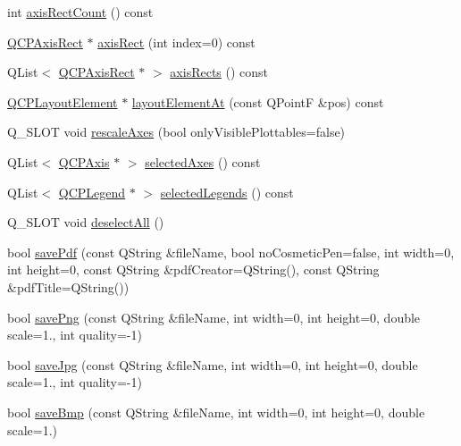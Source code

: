 \begin{DoxyCompactItemize}
\item 
int \mbox{\hyperlink{class_q_custom_plot_a8f85940aaac50efb466287d9d2d04ec6}{axis\+Rect\+Count}} () const
\item 
\mbox{\hyperlink{class_q_c_p_axis_rect}{Q\+C\+P\+Axis\+Rect}} $\ast$ \mbox{\hyperlink{class_q_custom_plot_ae5eefcb5f6ca26689b1fd4f6e25b42f9}{axis\+Rect}} (int index=0) const
\item 
Q\+List$<$ \mbox{\hyperlink{class_q_c_p_axis_rect}{Q\+C\+P\+Axis\+Rect}} $\ast$ $>$ \mbox{\hyperlink{class_q_custom_plot_a12af771429e2d7e313c8c5d5fca068fe}{axis\+Rects}} () const
\item 
\mbox{\hyperlink{class_q_c_p_layout_element}{Q\+C\+P\+Layout\+Element}} $\ast$ \mbox{\hyperlink{class_q_custom_plot_afaa1d304e0287d140fd238e90889ef3c}{layout\+Element\+At}} (const Q\+PointF \&pos) const
\item 
Q\+\_\+\+S\+L\+OT void \mbox{\hyperlink{class_q_custom_plot_ad86528f2cee6c7e446dea4a6e8839935}{rescale\+Axes}} (bool only\+Visible\+Plottables=false)
\item 
Q\+List$<$ \mbox{\hyperlink{class_q_c_p_axis}{Q\+C\+P\+Axis}} $\ast$ $>$ \mbox{\hyperlink{class_q_custom_plot_a7e6b07792b1cb2c31681596582d14dbe}{selected\+Axes}} () const
\item 
Q\+List$<$ \mbox{\hyperlink{class_q_c_p_legend}{Q\+C\+P\+Legend}} $\ast$ $>$ \mbox{\hyperlink{class_q_custom_plot_ac87624ddff1cbf4064781a8e8ae321c4}{selected\+Legends}} () const
\item 
Q\+\_\+\+S\+L\+OT void \mbox{\hyperlink{class_q_custom_plot_a9d4808ab925b003054085246c92a257c}{deselect\+All}} ()
\item 
bool \mbox{\hyperlink{class_q_custom_plot_a632da44c6d94ea8b271eb483b08b5114}{save\+Pdf}} (const Q\+String \&file\+Name, bool no\+Cosmetic\+Pen=false, int width=0, int height=0, const Q\+String \&pdf\+Creator=Q\+String(), const Q\+String \&pdf\+Title=Q\+String())
\item 
bool \mbox{\hyperlink{class_q_custom_plot_a7636261aff1f6d25c9da749ece3fc8b8}{save\+Png}} (const Q\+String \&file\+Name, int width=0, int height=0, double scale=1., int quality=-\/1)
\item 
bool \mbox{\hyperlink{class_q_custom_plot_a490c722092d1771e8ce4a7a73dfd84ab}{save\+Jpg}} (const Q\+String \&file\+Name, int width=0, int height=0, double scale=1., int quality=-\/1)
\item 
bool \mbox{\hyperlink{class_q_custom_plot_a6629d9e8e6da4bf18055ee0257fdce9a}{save\+Bmp}} (const Q\+String \&file\+Name, int width=0, int height=0, double scale=1.)

\end{DoxyCompactItemize}
